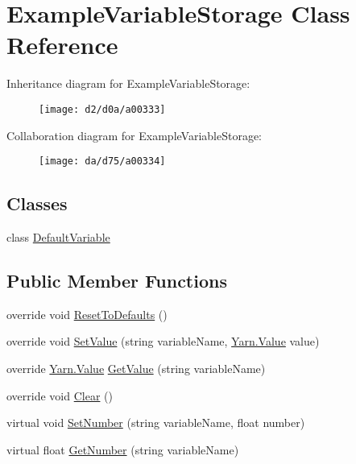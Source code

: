 \hypertarget{a00067}{\section{Example\-Variable\-Storage Class Reference}
\label{a00067}
}


Inheritance diagram for Example\-Variable\-Storage\-:
\nopagebreak
\begin{figure}[H]
\begin{center}
\leavevmode
\texttt{[image: d2/d0a/a00333]}
\end{center}
\end{figure}


Collaboration diagram for Example\-Variable\-Storage\-:
\nopagebreak
\begin{figure}[H]
\begin{center}
\leavevmode
\texttt{[image: da/d75/a00334]}
\end{center}
\end{figure}
\subsection*{Classes}
\begin{DoxyCompactItemize}
\item 
class \hyperlink{a00067_d0/d39/a00314}{Default\-Variable}
\end{DoxyCompactItemize}
\subsection*{Public Member Functions}
\begin{DoxyCompactItemize}
\item 
override void \hyperlink{a00067_a3a05d66cdacadb2e9b618cd0aef45f84}{Reset\-To\-Defaults} ()
\item 
override void \hyperlink{a00067_ac4265c1c9da485f13a6b05784b0f668d}{Set\-Value} (string variable\-Name, \hyperlink{a00161}{Yarn.\-Value} value)
\item 
override \hyperlink{a00161}{Yarn.\-Value} \hyperlink{a00067_a741593be1a299dcc2136f05b9b4a995a}{Get\-Value} (string variable\-Name)
\item 
override void \hyperlink{a00067_a0ce614bee8d5b220500fb765390b4ca3}{Clear} ()
\item 
virtual void \hyperlink{a00165_ac0d2f2e081944ad197992a26ad1a833c}{Set\-Number} (string variable\-Name, float number)
\item 
virtual float \hyperlink{a00165_add85a45dd65a5d4bd41c9d5ce5f77d19}{Get\-Number} (string variable\-Name)
\end{DoxyCompactItemize}
